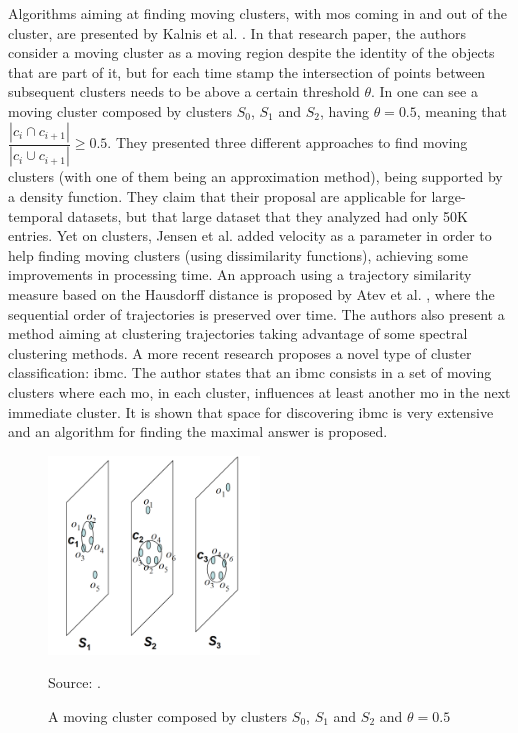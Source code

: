 Algorithms aiming at finding moving clusters, with \acp{mo} coming in and out of the cluster, are presented by Kalnis et
al.  \citep{movingclusters}. In that research paper, the authors consider a moving cluster as a moving region despite
the identity of the objects that are part of it, but for each time stamp the intersection of points between subsequent
clusters needs to be above a certain threshold $\theta$. In  one can see a moving cluster composed
by clusters $S_0$, $S_1$ and $S_2$, having $\theta=0.5$, meaning that $\dfrac{|c_i \cap c_{i+1}|}{|c_i \cup c_{i+1}|}
\geq 0.5$. They presented three different approaches to find moving clusters (with one of them being an approximation
method), being supported by a density function. They claim that their proposal are applicable for large-temporal
datasets, but that large dataset that they analyzed had only 50K entries. Yet on clusters, Jensen et al.
\citep{clusters3} added velocity as a parameter in order to help finding moving clusters (using dissimilarity
functions), achieving some improvements in processing time. An approach using a trajectory similarity measure based on
the Hausdorff distance is proposed by Atev et al. \citep{clusters2}, where the sequential order of trajectories is
preserved over time. The authors also present a method aiming at clustering trajectories taking advantage of some
spectral clustering methods. A more recent research \citep{clusters1} proposes a novel type of cluster classification:
\ac{ibmc}. The author states that an \ac{ibmc} consists in a set of moving clusters where each \ac{mo}, in each cluster,
influences at least another \ac{mo} in the next immediate cluster. It is shown that space for discovering \ac{ibmc} is
very extensive and an algorithm for finding the maximal answer is proposed.

\begin{figure}
    \centering
    \caption{A moving cluster composed by clusters $S_0$, $S_1$ and $S_2$ and $\theta=0.5$}
    \centerline{\includegraphics[width=0.5\textwidth]{images/clusters.png}}
    \footnotesize{Source: \citep{movingclusters}.}
    \label{fig:clusters}
\end{figure}

